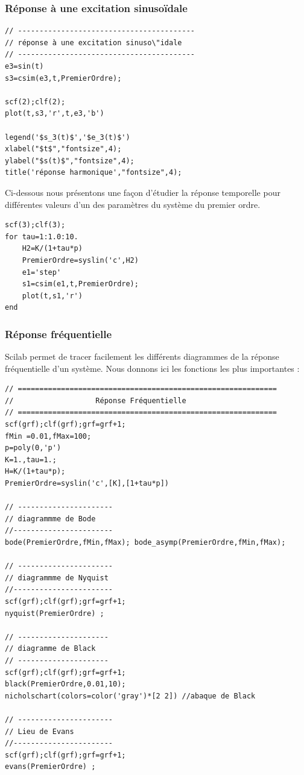 \subsubsection{Réponse à une excitation sinuso\"idale}
\begin{code}
\begin{verbatim}
// -----------------------------------------
// réponse à une excitation sinuso\"idale 
// -----------------------------------------
e3=sin(t)
s3=csim(e3,t,PremierOrdre);

scf(2);clf(2);
plot(t,s3,'r',t,e3,'b')

legend('$s_3(t)$','$e_3(t)$')
xlabel("$t$","fontsize",4);
ylabel("$s(t)$","fontsize",4); 
title('réponse harmonique',"fontsize",4);
\end{verbatim}
\end{code}

Ci-dessous nous présentons une façon d'étudier la réponse temporelle pour
différentes valeurs d'un des paramètres du système du premier ordre.
\begin{code}
\begin{verbatim}
scf(3);clf(3);
for tau=1:1.0:10.
    H2=K/(1+tau*p)
    PremierOrdre=syslin('c',H2)
    e1='step'
    s1=csim(e1,t,PremierOrdre);
    plot(t,s1,'r')
end
\end{verbatim}
\end{code}


\subsubsection{Réponse fréquentielle}
Scilab permet de tracer facilement les différents diagrammes de la réponse fréquentielle d'un système.
Nous donnons ici les fonctions les plus importantes : 
\begin{code}
\begin{verbatim}
// ============================================================
//                   Réponse Fréquentielle
// ============================================================
scf(grf);clf(grf);grf=grf+1;
fMin =0.01,fMax=100;
p=poly(0,'p')
K=1.,tau=1.;
H=K/(1+tau*p);
PremierOrdre=syslin('c',[K],[1+tau*p])

// ----------------------
// diagrammme de Bode
//-----------------------
bode(PremierOrdre,fMin,fMax); bode_asymp(PremierOrdre,fMin,fMax);

// ----------------------
// diagrammme de Nyquist
//-----------------------
scf(grf);clf(grf);grf=grf+1;
nyquist(PremierOrdre) ;

// ---------------------
// diagramme de Black
// ---------------------
scf(grf);clf(grf);grf=grf+1;
black(PremierOrdre,0.01,10);
nicholschart(colors=color('gray')*[2 2]) //abaque de Black

// ----------------------
// Lieu de Evans
//-----------------------
scf(grf);clf(grf);grf=grf+1;
evans(PremierOrdre) ;
\end{verbatim}
\end{code}


